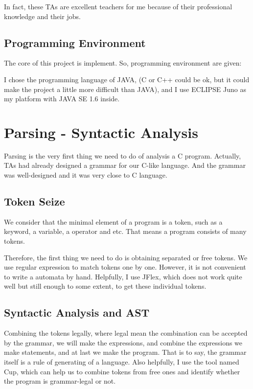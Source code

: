 \documentclass[preprint, 9pt]{sigplanconf}
\begin{document}
    In fact, these TAs are excellent teachers for me because of their professional knowledge and their jobs.

    \subsection{Programming Environment}
    The core of this project is implement.
    So, programming environment are given:

    I chose the programming language of JAVA, (C or C++ could be ok, but it could make the project a little more difficult than JAVA), and I use ECLIPSE Juno as my platform with JAVA SE 1.6 inside.


\section{Parsing - Syntactic Analysis}

    Parsing is the very first thing we need to do of analysis a C program.
    Actually, TAs had already designed a grammar for our C-like language.
    And the grammar was well-designed and it was very close to C language.

    \subsection{Token Seize}
    We consider that the minimal element of a program is a token, such as a keyword, a variable, a operator and etc.
    That means a program consists of many tokens.

    Therefore, the first thing we need to do is obtaining separated or free tokens.
    We use regular expression to match tokens one by one.
    However, it is not convenient to write a automata by hand.
    Helpfully, I use JFlex, which does not work quite well but still enough to some extent, to get these individual tokens.

    \subsection{Syntactic Analysis and AST}
    Combining the tokens legally, where legal mean the combination can be accepted by the grammar, we will make the expressions, and combine the expressions we make statements, and at last we make the program.
    That is to say, the grammar itself is a rule of generating of a language.
    Also helpfully, I use the tool named Cup, which can help us to combine tokens from free ones and identify whether the program is grammar-legal or not.
\end{document}
